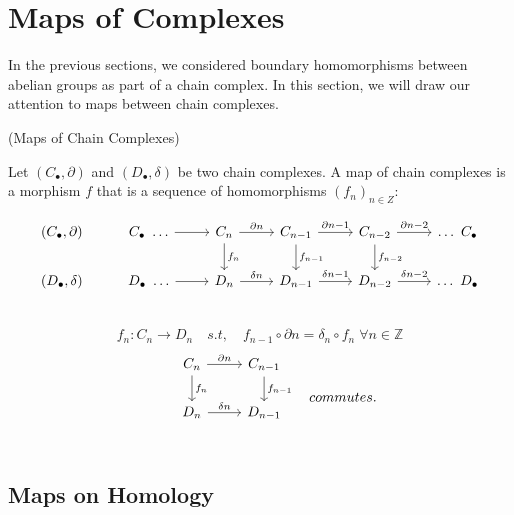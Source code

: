 \documentclass[11pt,a4paper]{report}
\begin{document}
    \section{Maps of Complexes}
    In the previous sections, we considered boundary homomorphisms between abelian groups as part of a chain complex. In this section, we will draw our attention to maps between chain complexes.

    \begin{defn}(Maps of Chain Complexes)

     Let $(C_\bullet, \partial)$ and $(D_\bullet, \delta)$ be two chain complexes.
     A map of chain complexes is a morphism $f$ that is a sequence of homomorphisms $(f_n)_{n  \in  Z}$:

            \[
                  \begin{tikzcd}[ampersand replacement=\&]
                    (C_\bullet, \partial) \& C_\bullet \ \ldots \arrow[r]  \& C_n \arrow[r, "\partial n"] \arrow[d, "{f_n}"]   \& C_{n-1} \arrow[r, "\partial {n-1}"] \arrow[d, "f_{n-1}"]   \& C_{n-2} \arrow[r, "\partial {n-2}"] \arrow[d, "f_{n-2}"]    \& \ldots \ C_\bullet \\
                    (D_\bullet, \delta) \& D_\bullet \ \ldots \arrow[r]    \& D_n \arrow[r, "\delta n"]    \& D_{n-1} \arrow[r, "\delta {n-1}"]    \& D_{n-2} \arrow[r, "\delta {n-2}"]   \& \ldots \ D_\bullet \\
                  \end{tikzcd}
                \]
            \[
                  f_n : C_n \rightarrow D_n \quad s.t, \quad   f_{n-1} \circ \partial n = \delta_n \circ f_n \; \forall n \in \mathbb{Z}
                  \]
                   \[
                  \begin{tikzcd}[ampersand replacement=\&]
                    \& C_n \arrow[r, "\partial n"] \arrow[d, "{f_n}"]    \& C_{n-1} \arrow[d, "{f_{n-1}}"] \\
                    \& D_n \arrow[r, "\delta n"]    \& D_{n-1} \\
                  \end{tikzcd}
                   \quad         commutes.
                \]


    \end{defn}



    \subsection{Maps on Homology}
\end{document}
